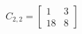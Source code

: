 \documentclass[10pt,convert]{standalone}
\begin{document}
$ C_{2, 2} = \begin{bmatrix}
1  & 3 \\
18 & 8
\end{bmatrix}  $
\end{document}
